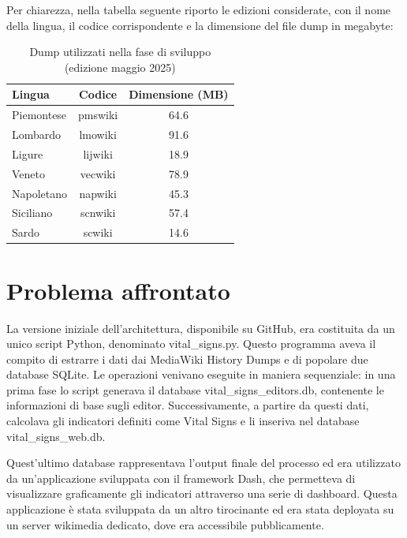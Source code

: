Per chiarezza, nella tabella seguente riporto le edizioni considerate, con il nome della lingua, il codice corrispondente e la dimensione del file dump in megabyte:
\begin{table}[htbp]
    \centering
    \begin{tabular}{|l|c|c|}
        \hline
        \textbf{Lingua} & \textbf{Codice} & \textbf{Dimensione (MB)} \\
        \hline
        Piemontese & pmswiki & 64.6 \\
        Lombardo   & lmowiki & 91.6 \\
        Ligure     & lijwiki & 18.9 \\
        Veneto     & vecwiki & 78.9 \\
        Napoletano & napwiki & 45.3 \\
        Siciliano  & scnwiki & 57.4 \\
        Sardo      & scwiki  & 14.6 \\
        \hline
    \end{tabular}
    \caption{Dump utilizzati nella fase di sviluppo (edizione maggio 2025)}
    \label{tab:dumps_sviluppo}
\end{table}


\section{Problema affrontato}
\label{sec:problema_affrontato}

La versione iniziale dell’architettura, disponibile su GitHub, era costituita da un unico script Python, denominato vital\_signs.py. Questo programma aveva il compito di estrarre i dati dai MediaWiki History Dumps e di popolare due database SQLite. Le operazioni venivano eseguite in maniera sequenziale: in una prima fase lo script generava il database vital\_signs\_editors.db, contenente le informazioni di base sugli editor. Successivamente, a partire da questi dati, calcolava gli indicatori definiti come Vital Signs e li inseriva nel database vital\_signs\_web.db.


Quest’ultimo database rappresentava l’output finale del processo ed era utilizzato da un’applicazione sviluppata con il framework Dash, che permetteva di visualizzare graficamente gli indicatori attraverso una serie di dashboard.
Questa applicazione è stata sviluppata da un altro tirocinante ed era stata deployata su un server wikimedia dedicato, dove era accessibile pubblicamente.

